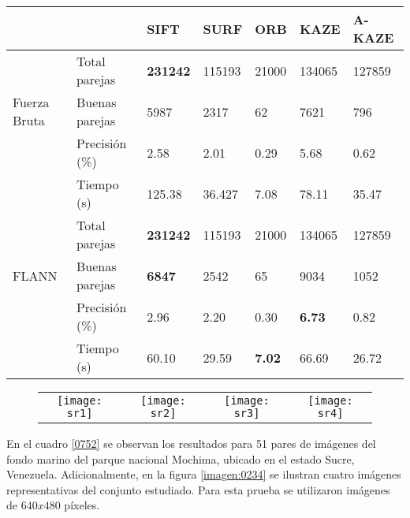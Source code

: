 \begin{table}[h]
	\centering
	\label{SR-2}
	\renewcommand{\arraystretch}{0.8}%
	\begin{tabular}{@{}lllllll@{}}
		\toprule
		&              	 			& SIFT 			 & SURF & ORB & KAZE  & A-KAZE \\ \midrule 
		\hfill\vline& Total parejas  &\textbf{231242}&115193&21000&134065 & 127859  \\
		Fuerza Bruta \vline& Buenas parejas & 5987 	& 2317 & 62  & 7621 & 796    \\
		\hfill\vline& Precisión (\%) & 2.58			&2.01  &0.29 &5.68& 0.62  \\
		\vspace{0.3cm}
		\hfill\vline& Tiempo (s)     & 125.38& 36.427& 7.08 &78.11 & 35.47 \\
		
		\hfill\vline& Total parejas  		&\textbf{231242}		&115193 &21000	&134065 		& 127859  \\
		FLANN  \hfill\vline& Buenas parejas &\textbf{6847}  		& 2542  & 65  	& 9034 			&1052     \\ 
		\hfill\vline& Precisión (\%) 		& 2.96					&2.20   &0.30	& \textbf{6.73} & 0.82  \\
		\hfill\vline& Tiempo (s)     		& 60.10					&29.59 & \textbf{7.02}	& 66.69			& 26.72  \\ 
		\bottomrule
	\end{tabular}
\end{table}
	 
\begin{figure}[h]
 	\centering
 	\vspace{0.6cm}
 	\begin{tabular}{@{}cccc@{}}
 		\texttt{[image: sr1]} &
 		\texttt{[image: sr2]} &
 		\texttt{[image: sr3]} &
 		\texttt{[image: sr4]} 
 	\end{tabular}
 	
 	\label{imagen:SR}
 	
\end{figure}

En el cuadro \ref{0752} se observan los resultados para 51 pares de imágenes del fondo marino del parque nacional Mochima, ubicado en el estado Sucre, Venezuela. Adicionalmente, en la figura \ref{imagen:0234} se ilustran cuatro imágenes representativas del conjunto estudiado. Para esta prueba se utilizaron imágenes de $640x480$ píxeles.

